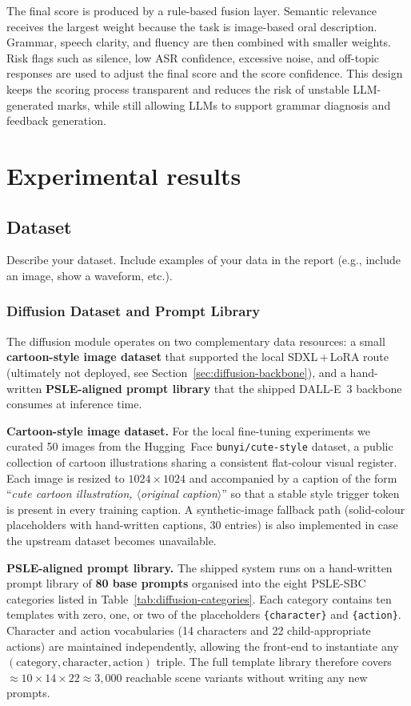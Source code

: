 \documentclass{article}
\begin{document}
The final score is produced by a rule-based fusion layer. Semantic relevance receives the largest weight because the task is image-based oral description. Grammar, speech clarity, and fluency are then combined with smaller weights. Risk flags such as silence, low ASR confidence, excessive noise, and off-topic responses are used to adjust the final score and the score confidence. This design keeps the scoring process transparent and reduces the risk of unstable LLM-generated marks, while still allowing LLMs to support grammar diagnosis and feedback generation.

\section{Experimental results}

\subsection{Dataset}
Describe your dataset. Include examples of your data in the report (e.g., include an image, show a waveform, etc.).

\subsubsection{Diffusion Dataset and Prompt Library}
\label{sec:diffusion-dataset}

The diffusion module operates on two complementary data resources: a
small \textbf{cartoon-style image dataset} that supported the local
SDXL\,+\,LoRA route (ultimately not deployed, see
Section~\ref{sec:diffusion-backbone}), and a hand-written
\textbf{PSLE-aligned prompt library} that the shipped DALL-E~3
backbone consumes at inference time.

\noindent\textbf{Cartoon-style image dataset.}
For the local fine-tuning experiments we curated 50 images from the
Hugging~Face \texttt{bunyi/cute-style} dataset, a public collection of
cartoon illustrations sharing a consistent flat-colour visual register.
Each image is resized to $1024\!\times\!1024$ and accompanied by a
caption of the form ``\textit{cute cartoon illustration,
$\langle$original caption$\rangle$}'' so that a stable style trigger
token is present in every training caption. A synthetic-image fallback
path (solid-colour placeholders with hand-written captions, 30 entries)
is also implemented in case the upstream dataset becomes unavailable.

\noindent\textbf{PSLE-aligned prompt library.}
The shipped system runs on a hand-written prompt library of \textbf{80
base prompts} organised into the eight PSLE-SBC categories listed in
Table~\ref{tab:diffusion-categories}. Each category contains ten
templates with zero, one, or two of the placeholders
\verb|{character}| and \verb|{action}|. Character and action
vocabularies (14 characters and 22 child-appropriate actions) are
maintained independently, allowing the front-end to instantiate any
$(\text{category},\text{character},\text{action})$ triple. The full
template library therefore covers
$\approx 10\!\times\!14\!\times\!22 \approx 3{,}000$ reachable scene
variants without writing any new prompts.
\end{document}
